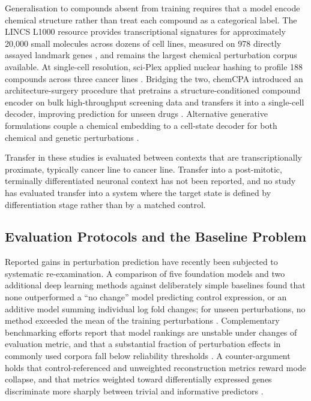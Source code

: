 \documentclass[5p,times,twocolumn]{elsarticle}
\begin{document}
Generalisation to compounds absent from training requires that a model encode
chemical structure rather than treat each compound as a categorical label. The
LINCS L1000 resource provides transcriptional signatures for approximately
20{,}000 small molecules across dozens of cell lines, measured on 978 directly
assayed landmark genes \cite{subramanian2017next}, and remains the largest
chemical perturbation corpus available. At single-cell resolution, sci-Plex
applied nuclear hashing to profile 188 compounds across three cancer lines
\cite{srivatsan2020massively}. Bridging the two, chemCPA introduced an
architecture-surgery procedure that pretrains a structure-conditioned compound
encoder on bulk high-throughput screening data and transfers it into a
single-cell decoder, improving prediction for unseen drugs
\cite{hetzel2022predicting}. Alternative generative formulations couple a chemical
embedding to a cell-state decoder for both chemical and genetic perturbations
\cite{yu2025perturbnet}.

Transfer in these studies is evaluated between contexts that are
transcriptionally proximate, typically cancer line to cancer line. Transfer into
a post-mitotic, terminally differentiated neuronal context has not been reported,
and no study has evaluated transfer into a system where the target state is
defined by differentiation stage rather than by a matched control.

\subsection{\textbf{Evaluation Protocols and the Baseline Problem}}

Reported gains in perturbation prediction have recently been subjected to
systematic re-examination. A comparison of five foundation models and two
additional deep learning methods against deliberately simple baselines found that
none outperformed a ``no change'' model predicting control expression, or an
additive model summing individual log fold changes; for unseen perturbations, no
method exceeded the mean of the training perturbations
\cite{ahlmann2025deep}. Complementary benchmarking efforts report that
model rankings are unstable under changes of evaluation metric, and that a
substantial fraction of perturbation effects in commonly used corpora fall below
reliability thresholds \cite{wu2026perturbench}. A
counter-argument holds that control-referenced and unweighted reconstruction
metrics reward mode collapse, and that metrics weighted toward differentially
expressed genes discriminate more sharply between trivial and informative
predictors \cite{mejia2025diversity}.
\end{document}
